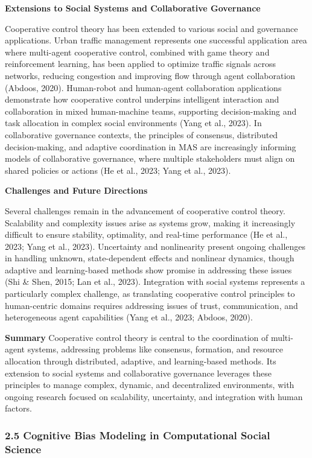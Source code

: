 \textbf{Extensions to Social Systems and Collaborative Governance}

Cooperative control theory has been extended to various social and
governance applications. Urban traffic management represents one
successful application area where multi-agent cooperative control,
combined with game theory and reinforcement learning, has been applied
to optimize traffic signals across networks, reducing congestion and
improving flow through agent collaboration (Abdoos, 2020). Human-robot
and human-agent collaboration applications demonstrate how cooperative
control underpins intelligent interaction and collaboration in mixed
human-machine teams, supporting decision-making and task allocation in
complex social environments (Yang et al., 2023). In collaborative
governance contexts, the principles of consensus, distributed
decision-making, and adaptive coordination in MAS are increasingly
informing models of collaborative governance, where multiple
stakeholders must align on shared policies or actions (He et al., 2023;
Yang et al., 2023).

\textbf{Challenges and Future Directions}

Several challenges remain in the advancement of cooperative control
theory. Scalability and complexity issues arise as systems grow, making
it increasingly difficult to ensure stability, optimality, and real-time
performance (He et al., 2023; Yang et al., 2023). Uncertainty and
nonlinearity present ongoing challenges in handling unknown,
state-dependent effects and nonlinear dynamics, though adaptive and
learning-based methods show promise in addressing these issues (Shi \&
Shen, 2015; Lan et al., 2023). Integration with social systems
represents a particularly complex challenge, as translating cooperative
control principles to human-centric domains requires addressing issues
of trust, communication, and heterogeneous agent capabilities (Yang et
al., 2023; Abdoos, 2020).

\textbf{Summary} Cooperative control theory is central to the
coordination of multi-agent systems, addressing problems like consensus,
formation, and resource allocation through distributed, adaptive, and
learning-based methods. Its extension to social systems and
collaborative governance leverages these principles to manage complex,
dynamic, and decentralized environments, with ongoing research focused
on scalability, uncertainty, and integration with human factors.

\subsubsection{2.5 Cognitive Bias Modeling in Computational Social
Science}\label{cognitive-bias-modeling-in-computational-social-science}

